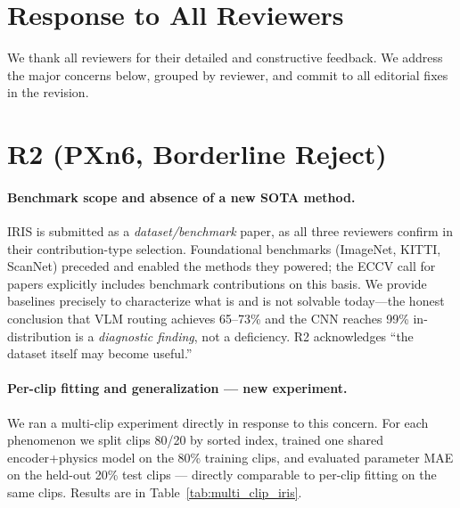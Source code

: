 \documentclass[10pt,twocolumn,letterpaper]{article}
\begin{document}
\maketitle
\thispagestyle{empty}
\appendix

\section{Response to All Reviewers}

We thank all reviewers for their detailed and constructive feedback. We address the major concerns below, grouped by reviewer, and commit to all editorial fixes in the revision.

\section{R2 (PXn6, Borderline Reject)}

\paragraph{Benchmark scope and absence of a new SOTA method.}
IRIS is submitted as a \emph{dataset/benchmark} paper, as all three reviewers confirm in their contribution-type selection. Foundational benchmarks (ImageNet, KITTI, ScanNet) preceded and enabled the methods they powered; the ECCV call for papers explicitly includes benchmark contributions on this basis. We provide baselines precisely to characterize what is and is not solvable today---the honest conclusion that VLM routing achieves 65--73\% and the CNN reaches 99\% in-distribution is a \emph{diagnostic finding}, not a deficiency. R2 acknowledges ``the dataset itself may become useful.''

\paragraph{Per-clip fitting and generalization — new experiment.}
We ran a multi-clip experiment directly in response to this concern. For each phenomenon we split clips 80/20 by sorted index, trained one shared encoder+physics model on the 80\% training clips, and evaluated parameter MAE on the held-out 20\% test clips — directly comparable to per-clip fitting on the same clips. Results are in Table~\ref{tab:multi_clip_iris}.
\end{document}
